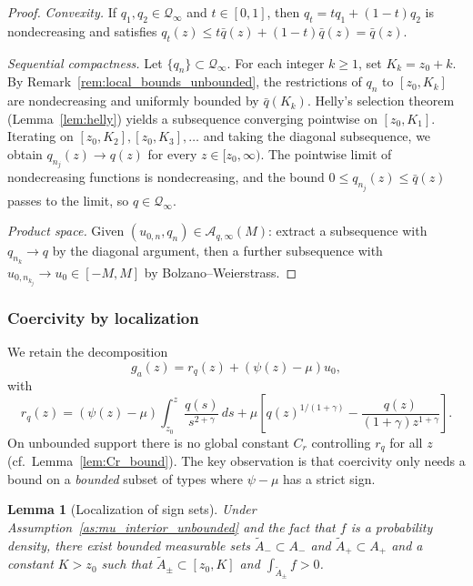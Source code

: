 \documentclass[12pt,a4paper]{article}
\theoremstyle{definition}
\theoremstyle{plain}
\newtheorem{lemma}{Lemma}[section]
\theoremstyle{remark}
\newcommand{\zlow}{z_{\scriptscriptstyle 0}}
\begin{document}
\begin{proof}
\emph{Convexity.}
If $q_1, q_2 \in \mathcal{Q}_\infty$ and $t \in [0,1]$,
then $q_t = tq_1 + (1-t)q_2$ is nondecreasing and satisfies
$q_t(z) \leq t\bar q(z) + (1-t)\bar q(z) = \bar q(z)$.

\emph{Sequential compactness.}
Let $\{q_n\} \subset \mathcal{Q}_\infty$.
For each integer $k \geq 1$, set $K_k = \zlow + k$.  By
Remark~\ref{rem:local_bounds_unbounded}, the restrictions
of $q_n$ to $[\zlow,K_k]$ are nondecreasing and uniformly
bounded by $\bar q(K_k)$.  Helly's selection theorem
(Lemma~\ref{lem:helly}) yields a subsequence converging
pointwise on $[\zlow,K_1]$.  Iterating on
$[\zlow,K_2], [\zlow,K_3], \ldots$ and taking the diagonal
subsequence, we obtain $q_{n_j}(z) \to q(z)$ for every
$z \in [\zlow,\infty)$.  The pointwise limit of
nondecreasing functions is nondecreasing, and the bound
$0 \leq q_{n_j}(z) \leq \bar q(z)$ passes to the limit, so
$q \in \mathcal{Q}_\infty$.

\emph{Product space.}
Given $(u_{0,n}, q_n) \in \mathcal{A}_{q,\infty}(M)$:
extract a subsequence with $q_{n_k} \to q$ by the diagonal
argument, then a further subsequence with
$u_{0,n_{k_j}} \to u_0 \in [-M,M]$ by
Bolzano--Weierstrass.
\end{proof}


\subsubsection{Coercivity by localization}

We retain the decomposition
\begin{equation}
\label{eq:g_decompose_unbounded}
  g_a(z) = r_q(z) + (\psi(z)-\mu)u_0,
\end{equation}
with
\begin{equation}
\label{eq:r_q_unbounded}
  r_q(z)
  = (\psi(z)-\mu)\int_{\zlow}^z \frac{q(s)}{s^{2+\gamma}}\,ds
  + \mu\!\left[q(z)^{1/(1+\gamma)}
  - \frac{q(z)}{(1+\gamma)z^{1+\gamma}}\right].
\end{equation}
On unbounded support there is no global constant $C_r$
controlling $r_q$ for all $z$
(cf.\ Lemma~\ref{lem:Cr_bound}).  The key observation is
that coercivity only needs a bound on a \emph{bounded}
subset of types where $\psi-\mu$ has a strict sign.

\begin{lemma}[Localization of sign sets]
\label{lem:localize_sign_sets_unbounded}
Under Assumption~\ref{as:mu_interior_unbounded} and the fact that
$f$ is a probability density, there exist bounded measurable sets
$\widetilde A_- \subset A_-$ and $\widetilde A_+ \subset A_+$ and a
constant $K > \zlow$ such that
$\widetilde A_\pm \subset [\zlow,K]$ and
$\int_{\widetilde A_\pm} f > 0$.
\end{lemma}
\end{document}
